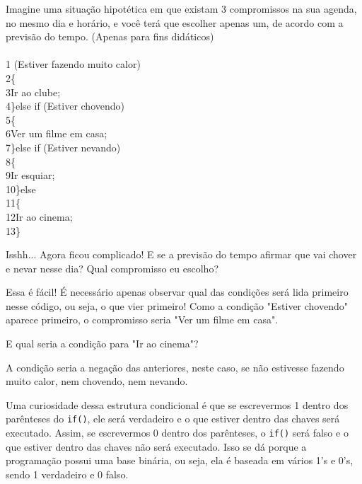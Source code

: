 \documentclass[conference]{IEEEtran}
\begin{document}
\par
Imagine uma situação hipotética em que existam 3 compromissos na sua agenda, no mesmo dia e horário, e você terá que escolher apenas um, de acordo com a previsão do tempo. (Apenas para fins didáticos)
\\
\\
{\selectfont 
{\color{cinza}1} (Estiver fazendo muito calor)\\
{\color{cinza}2}\quad\{\\
{\color{cinza}3}\quad\quad Ir ao clube;\\
{\color{cinza}4}\quad\}{\color{verde}else if} (Estiver chovendo)\\
{\color{cinza}5}\quad\{\\
{\color{cinza}6}\quad\quad Ver um filme em casa;\\
{\color{cinza}7}\quad\}{\color{verde}else if} (Estiver nevando)\\
{\color{cinza}8}\quad\{\\
{\color{cinza}9}\quad\quad Ir esquiar;\\
{\color{cinza}10}\quad\}{\color{verde}else}\\
{\color{cinza}11}\quad\{\\
{\color{cinza}12}\quad\quad Ir ao cinema;\\
{\color{cinza}13}\quad\}}
\\
\par
Isshh... Agora ficou complicado! E se a previsão do tempo afirmar que vai chover e nevar nesse dia? Qual compromisso eu escolho?
\par
Essa é fácil! É necessário apenas observar qual das condições será lida primeiro nesse código, ou seja, o que vier primeiro! Como a condição "Estiver chovendo" aparece primeiro, o compromisso seria "Ver um filme em casa".
\par
E qual seria a condição para "Ir ao cinema"?
\par
A condição seria a negação das anteriores, neste caso, se não estivesse fazendo muito calor, nem chovendo, nem nevando.
\par
Uma curiosidade dessa estrutura condicional é que se escrevermos 1 dentro dos parênteses do \texttt{if()}, ele será verdadeiro e o que estiver dentro das chaves será executado. Assim, se escrevermos 0 dentro dos parênteses, o \texttt{if()} será falso e o que estiver dentro das chaves não será executado. Isso se dá porque a programação possui uma base binária, ou seja, ela é baseada em vários 1's e 0's, sendo 1 verdadeiro e 0 falso.
\end{document}
